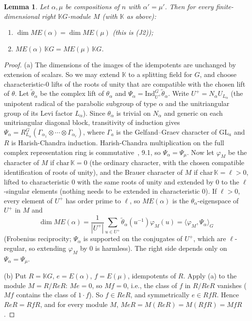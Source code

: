 \documentclass[11pt, letterpaper]{amsart}
\newtheorem{lemma}{Lemma}
\theoremstyle{definition}
\theoremstyle{remark}
\newcommand{\KK}{\mathbb{K}}
\newcommand{\GL}{\mathrm{GL}}
\newcommand{\Ind}{\mathrm{Ind}}
\begin{document}
\begin{lemma}\label{lemJ2}
Let $\alpha,\mu$ be compositions of $n$ with $\alpha'=\mu'$. Then for every finite-dimensional right $\KK G$-module $M$ (with $\KK$ as above):
\begin{enumerate}
\item[(a)] $\dim ME(\alpha)=\dim ME(\mu)$ (this is (J2));
\item[(b)] $ME(\alpha)\,\KK G=ME(\mu)\,\KK G$.
\end{enumerate}
\end{lemma}
\begin{proof}
(a) The dimensions of the images of the idempotents are unchanged by extension of scalars. So we may extend $\KK$ to a splitting field for $G$, and choose characteristic-$0$ lifts of the roots of unity that are compatible with the chosen lift of $\theta$. Let $\tilde\theta_\alpha$ be the complex lift of $\theta_\alpha$ and $\Psi_\alpha=\Ind_{U^+}^{G}\tilde\theta_\alpha$. Write $U^+=N_\alpha U_{L_\alpha}$ (the unipotent radical of the parabolic subgroup of type $\alpha$ and the unitriangular group of its Levi factor $L_\alpha$). Since $\theta_\alpha$ is trivial on $N_\alpha$ and generic on each unitriangular diagonal block, transitivity of induction gives $\Psi_\alpha=R_{L_\alpha}^{G}(\Gamma_{\alpha_1}\otimes\cdots\otimes\Gamma_{\alpha_r})$, where $\Gamma_a$ is the Gelfand--Graev character of $\GL_a$ and $R$ is Harish-Chandra induction. Harish-Chandra multiplication on the full complex representation ring is commutative~\cite{Z}, 9.1, so $\Psi_\alpha=\Psi_\mu$. Now let $\varphi_M$ be the character of $M$ if $\mathrm{char}\,\KK=0$ (the ordinary character, with the chosen compatible identification of roots of unity), and the Brauer character of $M$ if $\mathrm{char}\,\KK=\ell>0$, lifted to characteristic $0$ with the same roots of unity and extended by $0$ to the $\ell$-singular elements (nothing needs to be extended in characteristic $0$). If $\ell>0$, every element of $U^+$ has order prime to $\ell$, so $ME(\alpha)$ is the $\theta_\alpha$-eigenspace of $U^+$ in $M$ and
\[
\dim ME(\alpha)=\frac1{|U^+|}\sum_{u\in U^+}\tilde\theta_\alpha(u^{-1})\varphi_M(u)=\langle\varphi_M,\Psi_\alpha\rangle_G
\]
(Frobenius reciprocity; $\Psi_\alpha$ is supported on the conjugates of $U^+$, which are $\ell$-regular, so extending $\varphi_M$ by $0$ is harmless). The right side depends only on $\Psi_\alpha=\Psi_\mu$.

(b) Put $R=\KK G$, $e=E(\alpha)$, $f=E(\mu)$, idempotents of $R$. Apply (a) to the module $M=R/ReR$: $Me=0$, so $Mf=0$, i.e., the class of $f$ in $R/ReR$ vanishes ($Mf$ contains the class of $1\cdot f$). So $f\in ReR$, and symmetrically $e\in RfR$. Hence $ReR=RfR$, and for every module $M$, $MeR=M(ReR)=M(RfR)=MfR$.
\end{proof}
\end{document}
